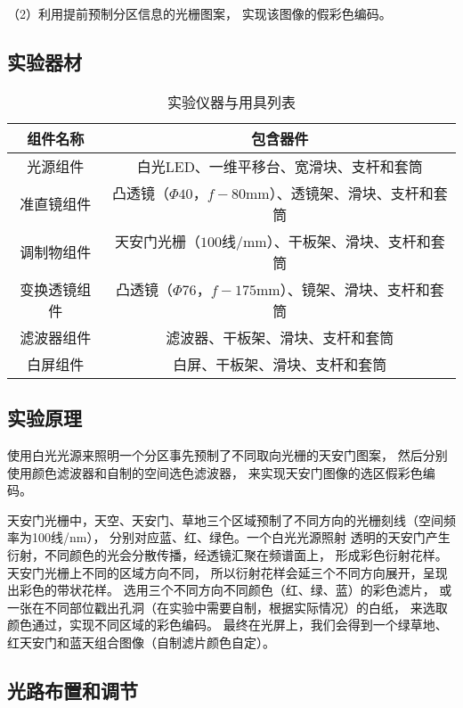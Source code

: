 \documentclass[11pt]{article}
\begin{document}
（2）利用提前预制分区信息的光栅图案，
实现该图像的假彩色编码。



\subsection{实验器材}

\begin{table}[htbp]
    \centering
    \begin{tabular}{cc}
        \toprule
        组件名称 & 包含器件\\ \midrule
        光源组件& 白光LED、一维平移台、宽滑块、支杆和套筒\\ 
        准直镜组件& 凸透镜（$\Phi 40$，$f-80$mm）、透镜架、滑块、支杆和套筒 \\ 
        调制物组件& 天安门光栅（$100$线/mm）、干板架、滑块、支杆和套筒\\ 
        变换透镜组件& 凸透镜（$\Phi 76$，$f-175$mm）、镜架、滑块、支杆和套筒\\ 
        滤波器组件& 滤波器、干板架、滑块、支杆和套筒\\ 
        白屏组件& 白屏、干板架、滑块、支杆和套筒\\ 
        \bottomrule
    \end{tabular}
    \caption{实验仪器与用具列表}
\end{table}

\subsection{实验原理}

使用白光光源来照明一个分区事先预制了不同取向光栅的天安门图案，
然后分别使用颜色滤波器和自制的空间选色滤波器，
来实现天安门图像的选区假彩色编码。

天安门光栅中，天空、天安门、草地三个区域预制了不同方向的光栅刻线（空间频率为100线/nm），
分别对应蓝、红、绿色。一个白光光源照射
透明的天安门产生衍射，不同颜色的光会分散传播，经透镜汇聚在频谱面上，
形成彩色衍射花样。
天安门光栅上不同的区域方向不同，
所以衍射花样会延三个不同方向展开，呈现出彩色的带状花样。
选用三个不同方向不同颜色（红、绿、蓝）的彩色滤片，
或一张在不同部位戳出孔洞（在实验中需要自制，根据实际情况）的白纸，
来选取颜色通过，实现不同区域的彩色编码。
最终在光屏上，我们会得到一个绿草地、
红天安门和蓝天组合图像（自制滤片颜色自定）。



\subsection{光路布置和调节}
\end{document}
